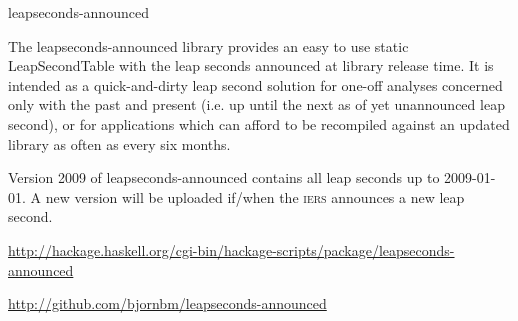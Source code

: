 \begin{hcarentry}[new]{leapseconds-announced}
\makeheader

The leapseconds-announced library provides an easy to use static Leap\-Second\-Table with the leap seconds announced at library release time. 
It is intended as a quick-and-dirty leap second solution for one-off analyses concerned only with the past and present (i.e. up until the next as of yet unannounced leap second), or for applications which can afford to be recompiled against an updated library as often as every six months.

Version 2009 of leapseconds-announced contains all leap seconds up to 2009-01-01. A new version will be uploaded if/when the \textsc{iers} announces a new leap second.

\FurtherReading
\begin{compactitem}
\item \url{http://hackage.haskell.org/cgi-bin/hackage-scripts/package/leapseconds-announced}
\item \url{http://github.com/bjornbm/leapseconds-announced}
\end{compactitem}
\end{hcarentry}
